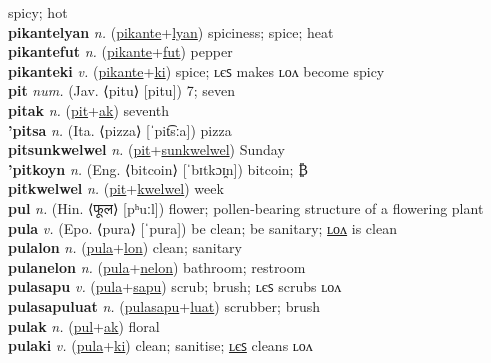 spicy; hot \label{pikantelon} \\
\textbf{pikantelyan} \textit{n.} (\hyperref[pikante]{pikante}+\hyperref[lyan]{lyan})
spiciness; spice; heat \label{pikantelyan} \\
\textbf{pikantefut} \textit{n.} (\hyperref[pikante]{pikante}+\hyperref[fut]{fut})
pepper \label{pikantefut} \\
\textbf{pikanteki} \textit{v.} (\hyperref[pikante]{pikante}+\hyperref[ki]{ki})
spice; ʟєꜱ makes ʟᴏᴧ become spicy \label{pikanteki} \\
\textbf{pit} \textit{num.} (Jav. ⟨pitu⟩ [pitu])
7; seven \label{pit} \\
\textbf{pitak} \textit{n.} (\hyperref[pit]{pit}+\hyperref[ak]{ak})
seventh \label{pitak} \\
\textbf{'pitsa} \textit{n.} (Ita. ⟨pizza⟩ [ˈpit͡sːa])
pizza \label{'pitsa} \\
\textbf{pitsunkwelwel} \textit{n.} (\hyperref[pit]{pit}+\hyperref[sunkwelwel]{sunkwelwel})
Sunday \label{pitsunkwelwel} \\
\textbf{'pitkoyn} \textit{n.} (Eng. ⟨bitcoin⟩ [ˈbɪtkɔɪ̯n])
bitcoin; ₿ \label{'pitkoyn} \\
\textbf{pitkwelwel} \textit{n.} (\hyperref[pit]{pit}+\hyperref[kwelwel]{kwelwel})
week \label{pitkwelwel} \\
\textbf{pul} \textit{n.} (Hin. ⟨फूल⟩ [pʰuːl])
flower; pollen-bearing structure of a flowering plant \label{pul} \\
\textbf{pula} \textit{v.} (Epo. ⟨pura⟩ [ˈpura])
be clean; be sanitary; \hyperref[pulalon]{ʟᴏᴧ} is clean \label{pula} \\
\textbf{pulalon} \textit{n.} (\hyperref[pula]{pula}+\hyperref[lon]{lon})
clean; sanitary \label{pulalon} \\
\textbf{pulanelon} \textit{n.} (\hyperref[pula]{pula}+\hyperref[nelon]{nelon})
bathroom; restroom \label{pulanelon} \\
\textbf{pulasapu} \textit{v.} (\hyperref[pula]{pula}+\hyperref[sapu]{sapu})
scrub; brush; ʟєꜱ scrubs ʟᴏᴧ \label{pulasapu} \\
\textbf{pulasapuluat} \textit{n.} (\hyperref[pulasapu]{pulasapu}+\hyperref[luat]{luat})
scrubber; brush \label{pulasapuluat} \\
\textbf{pulak} \textit{n.} (\hyperref[pul]{pul}+\hyperref[ak]{ak})
floral \label{pulak} \\
\textbf{pulaki} \textit{v.} (\hyperref[pula]{pula}+\hyperref[ki]{ki})
clean; sanitise; \hyperref[pulakiles]{ʟєꜱ} cleans ʟᴏᴧ \label{pulaki} \\
